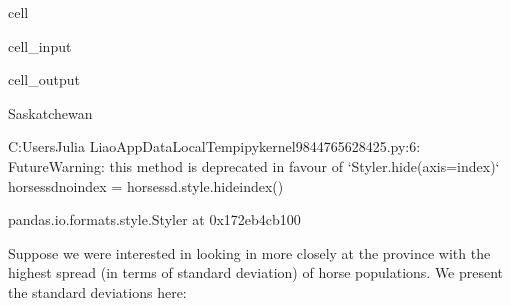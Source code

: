 \documentclass[letterpaper,10pt,english]{jupyterBook}
\begin{document}
\begin{sphinxuseclass}{cell}\begin{sphinxVerbatimInput}

\begin{sphinxuseclass}{cell_input}
\begin{sphinxVerbatim}[commandchars=\\\{\}]
  

  \PYG{p}{[}\PYG{p}{]}\PYG{p}{[}\PYG{p}{]}
 

  
 
\end{sphinxVerbatim}

\end{sphinxuseclass}\end{sphinxVerbatimInput}
\begin{sphinxVerbatimOutput}

\begin{sphinxuseclass}{cell_output}
\begin{sphinxVerbatim}[commandchars=\\\{\}]
\PYGZsq{}Saskatchewan\PYGZsq{}
\end{sphinxVerbatim}

\begin{sphinxVerbatim}[commandchars=\\\{\}]
C:\PYGZbs{}Users\PYGZbs{}Julia Liao\PYGZbs{}AppData\PYGZbs{}Local\PYGZbs{}Temp\PYGZbs{}ipykernel\PYGZus{}9844\PYGZbs{}765628425.py:6: FutureWarning: this method is deprecated in favour of `Styler.hide(axis=\PYGZdq{}index\PYGZdq{})`
  horses\PYGZus{}sd\PYGZus{}noindex = horses\PYGZus{}sd.style.hide\PYGZus{}index()
\end{sphinxVerbatim}

\begin{sphinxVerbatim}[commandchars=\\\{\}]
\PYGZlt{}pandas.io.formats.style.Styler at 0x172eb4cb100\PYGZgt{}
\end{sphinxVerbatim}

\end{sphinxuseclass}\end{sphinxVerbatimOutput}

\end{sphinxuseclass}
\sphinxAtStartPar
Suppose we were interested in looking in more closely at the
province with the highest spread (in terms of standard deviation)
of horse populations. We present the standard deviations here:
\end{document}
